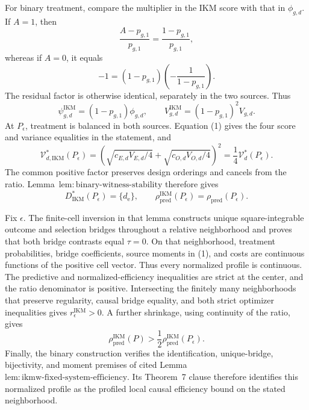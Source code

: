 For binary treatment, compare the multiplier in the IKM score with that in \(\phi_{g,d}\). If \(A=1\), then
\[
\frac{A-p_{g,1}}{p_{g,1}}=\frac{1-p_{g,1}}{p_{g,1}},
\]
whereas if \(A=0\), it equals
\[
-1=(1-p_{g,1})\left(-\frac1{1-p_{g,1}}\right).
\]
The residual factor is otherwise identical, separately in the two sources. Thus
\[
\psi_{g,d}^{\mathrm{IKM}}=(1-p_{g,1})\phi_{g,d},
\qquad V_{g,d}^{\mathrm{IKM}}=(1-p_{g,1})^2V_{g,d}. \tag{1}
\]
At \(P_\epsilon\), treatment is balanced in both sources. Equation (1) gives the four score and variance equalities in the statement, and
\[
\mathcal V_{d,\mathrm{IKM}}^*(P_\epsilon)
=\left(\sqrt{c_{E,d}V_{E,d}/4}
+\sqrt{c_{O,d}V_{O,d}/4}\right)^2
=\frac14\mathcal V_d^*(P_\epsilon). \tag{2}
\]
The common positive factor preserves design orderings and cancels from the ratio. Lemma~\(\mathrm{lem{:}binary\text{-}witness\text{-}stability}\) therefore gives
\[
D_{\mathrm{IKM}}^*(P_\epsilon)=\{d_{\mathrm e}\},\qquad
\rho_{\mathrm{pred}}^{\mathrm{IKM}}(P_\epsilon)
=\rho_{\mathrm{pred}}(P_\epsilon).
\]

Fix \(\epsilon\). The finite-cell inversion in that lemma constructs unique square-integrable outcome and selection bridges throughout a relative neighborhood and proves that both bridge contrasts equal \(\tau=0\). On that neighborhood, treatment probabilities, bridge coefficients, source moments in (1), and costs are continuous functions of the positive cell vector. Thus every normalized profile is continuous. The predictive and normalized-efficiency inequalities are strict at the center, and the ratio denominator is positive. Intersecting the finitely many neighborhoods that preserve regularity, causal bridge equality, and both strict optimizer inequalities gives \(r_\epsilon^{\mathrm{IKM}}>0\). A further shrinkage, using continuity of the ratio, gives
\[
\rho_{\mathrm{pred}}^{\mathrm{IKM}}(P)
>\frac12\rho_{\mathrm{pred}}^{\mathrm{IKM}}(P_\epsilon).
\]
Finally, the binary construction verifies the identification, unique-bridge, bijectivity, and moment premises of cited Lemma~\(\mathrm{lem{:}ikmw\text{-}fixed\text{-}system\text{-}efficiency}\). Its Theorem~7 clause therefore identifies this normalized profile as the profiled local causal efficiency bound on the stated neighborhood.